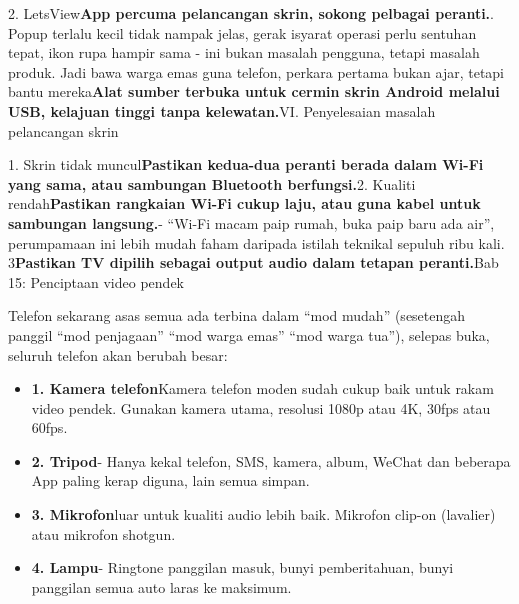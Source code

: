 


2. LetsView\textbf{App percuma pelancangan skrin, sokong pelbagai peranti.}. Popup terlalu kecil tidak nampak jelas, gerak isyarat operasi perlu sentuhan tepat, ikon rupa hampir sama - ini bukan masalah pengguna, tetapi masalah produk. Jadi bawa warga emas guna telefon, perkara pertama bukan ajar, tetapi bantu mereka\textbf{Alat sumber terbuka untuk cermin skrin Android melalui USB, kelajuan tinggi tanpa kelewatan.}VI. Penyelesaian masalah pelancangan skrin

1. Skrin tidak muncul\textbf{Pastikan kedua-dua peranti berada dalam Wi-Fi yang sama, atau sambungan Bluetooth berfungsi.}2. Kualiti rendah\textbf{Pastikan rangkaian Wi-Fi cukup laju, atau guna kabel untuk sambungan langsung.}- “Wi-Fi macam paip rumah, buka paip baru ada air”, perumpamaan ini lebih mudah faham daripada istilah teknikal sepuluh ribu kali. 3\textbf{Pastikan TV dipilih sebagai output audio dalam tetapan peranti.}Bab 15: Penciptaan video pendek


Telefon sekarang asas semua ada terbina dalam “mod mudah” (sesetengah panggil “mod penjagaan” “mod warga emas” “mod warga tua”), selepas buka, seluruh telefon akan berubah besar:

\begin{itemize}
  \item \textbf{1. Kamera telefon}Kamera telefon moden sudah cukup baik untuk rakam video pendek. Gunakan kamera utama, resolusi 1080p atau 4K, 30fps atau 60fps.
  \item \textbf{2. Tripod}- Hanya kekal telefon, SMS, kamera, album, WeChat dan beberapa App paling kerap diguna, lain semua simpan.
  \item \textbf{3. Mikrofon}luar untuk kualiti audio lebih baik. Mikrofon clip-on (lavalier) atau mikrofon shotgun.
  \item \textbf{4. Lampu}- Ringtone panggilan masuk, bunyi pemberitahuan, bunyi panggilan semua auto laras ke maksimum.
\end{itemize}

